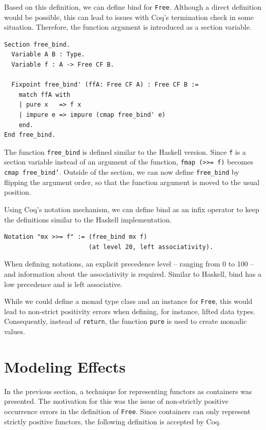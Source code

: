 \documentclass[a4paper, 11pt, fleqn, twoside, abstract=on]{scrreprt}
\newcommand{\hinl}[1]{\texttt{#1}}
\newcommand{\cinl}[1]{\texttt{#1}}
\begin{document}
Based on this definition, we can define bind for \cinl{Free}.
Although a direct definition would be possible, this can lead to issues with Coq's termination check in some situation.
Therefore, the function argument is introduced as a section variable.

\begin{verbatim}
Section free_bind.
  Variable A B : Type.
  Variable f : A -> Free CF B.

  Fixpoint free_bind' (ffA: Free CF A) : Free CF B :=
    match ffA with
    | pure x   => f x
    | impure e => impure (cmap free_bind' e)
    end.
End free_bind.
\end{verbatim}
\noindent
The function \cinl{free_bind} is defined similar to the Haskell version.
Since \cinl{f} is a section variable instead of an argument of the function, \hinl{fmap (>>= f)} becomes \cinl{cmap free_bind'}.
Outside of the section, we can now define \cinl{free_bind} by flipping the argument order, so that the function argument is moved to the usual position.

Using Coq's notation mechanism, we can define bind as an infix operator to keep the definitions similar to the Haskell implementation.

\begin{verbatim}
Notation "mx >>= f" := (free_bind mx f)
                       (at level 20, left associativity).
\end{verbatim}

When defining notations, an explicit precedence level -- ranging from 0 to 100 -- and information about the associativity is required.
Similar to Haskell, bind has a low precedence and is left associative.

While we could define a monad type class and an instance for \cinl{Free}, this would lead to non-strict positivity errors when defining, for instance, lifted data types.
Consequently, instead of \hinl{return}, the function \cinl{pure} is used to create monadic values.

\section{Modeling Effects}

In the previous section, a technique for representing functors as containers was presented.
The motivation for this was the issue of non-strictly positive occurrence errors in the definition of \cinl{Free}.
Since containers can only represent strictly positive functors, the following definition is accepted by Coq.
\end{document}

